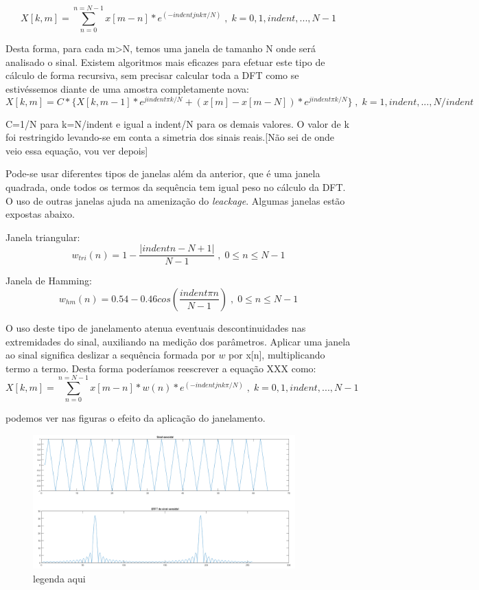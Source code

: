 \documentclass[a4paper, 12pt]{book}
\begin{document}
\begin{equation}
X[k,m]=\sum_{n=0}^{n=N-1} x[m-n]*e^{(-indentjnk\pi/N)}\;,\;k=0,1,indent,...,N-1
\end{equation}

\indent Desta forma, para cada m>N, temos uma janela de tamanho N onde será analisado o sinal. Existem algoritmos mais eficazes para efetuar este tipo de cálculo de forma recursiva, sem precisar calcular toda a DFT como se estivéssemos diante de uma amostra completamente nova:
\begin{equation}
    X[k,m]=C*\{X[k,m-1]*e^{jindent\pi k/N}+(x[m]-x[m-N])*e^{jindent\pi k/N}\}\;,\;k=1,indent,...,N/indent
\end{equation}

\indent C=1/N para k=N/indent e igual a indent/N para os demais valores. O valor de k foi restringido levando-se em conta a simetria dos sinais reais.[Não sei de onde veio essa equação, vou ver depois]

\indent Pode-se usar diferentes tipos de janelas além da anterior, que é uma janela quadrada, onde todos os termos da sequência tem igual peso no cálculo da DFT. O uso de outras janelas ajuda na amenização do \textit{leackage}. Algumas janelas estão expostas abaixo.

Janela triangular:
\begin{equation}
w_{tri}(n)=1-\frac{|indentn-N+1|}{N-1}\;,\;0\leq n \leq N-1
\end{equation}

Janela de Hamming:
\begin{equation}
w_{hm}(n)=0.54-0.46cos(\frac{indent\pi n}{N-1})\;,\;0\leq n \leq N-1
\end{equation}

\indent O uso deste tipo de janelamento atenua eventuais descontinuidades nas extremidades do sinal, auxiliando na medição dos parâmetros. Aplicar uma janela ao sinal significa deslizar a sequência formada por $w$ por x[n], multiplicando termo a termo. Desta forma poderíamos reescrever a equação XXX como:
\begin{equation}
X[k,m]=\sum_{n=0}^{n=N-1} x[m-n]*w(n)*e^{(-indentjnk\pi/N)}\;,\;k=0,1,indent,...,N-1
\end{equation}

\indent podemos ver nas figuras o efeito da aplicação do janelamento.

\begin{figure}[h]
    \centering
    \includegraphics[width=0.9\textwidth]{figuras/f5.png}
    \caption{legenda aqui}
    \label{fig:f5}
\end{figure}
\end{document}
